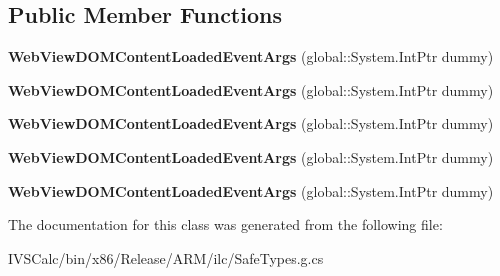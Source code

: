 \subsection*{Public Member Functions}
\begin{DoxyCompactItemize}
\item 
\mbox{\label{class_windows_1_1_u_i_1_1_xaml_1_1_controls_1_1_web_view_d_o_m_content_loaded_event_args_a5a9069485595f540edaba2c260a209bd}} 
{\bfseries Web\+View\+D\+O\+M\+Content\+Loaded\+Event\+Args} (global\+::\+System.\+Int\+Ptr dummy)
\item 
\mbox{\label{class_windows_1_1_u_i_1_1_xaml_1_1_controls_1_1_web_view_d_o_m_content_loaded_event_args_a5a9069485595f540edaba2c260a209bd}} 
{\bfseries Web\+View\+D\+O\+M\+Content\+Loaded\+Event\+Args} (global\+::\+System.\+Int\+Ptr dummy)
\item 
\mbox{\label{class_windows_1_1_u_i_1_1_xaml_1_1_controls_1_1_web_view_d_o_m_content_loaded_event_args_a5a9069485595f540edaba2c260a209bd}} 
{\bfseries Web\+View\+D\+O\+M\+Content\+Loaded\+Event\+Args} (global\+::\+System.\+Int\+Ptr dummy)
\item 
\mbox{\label{class_windows_1_1_u_i_1_1_xaml_1_1_controls_1_1_web_view_d_o_m_content_loaded_event_args_a5a9069485595f540edaba2c260a209bd}} 
{\bfseries Web\+View\+D\+O\+M\+Content\+Loaded\+Event\+Args} (global\+::\+System.\+Int\+Ptr dummy)
\item 
\mbox{\label{class_windows_1_1_u_i_1_1_xaml_1_1_controls_1_1_web_view_d_o_m_content_loaded_event_args_a5a9069485595f540edaba2c260a209bd}} 
{\bfseries Web\+View\+D\+O\+M\+Content\+Loaded\+Event\+Args} (global\+::\+System.\+Int\+Ptr dummy)
\end{DoxyCompactItemize}


The documentation for this class was generated from the following file\+:\begin{DoxyCompactItemize}
\item 
I\+V\+S\+Calc/bin/x86/\+Release/\+A\+R\+M/ilc/Safe\+Types.\+g.\+cs\end{DoxyCompactItemize}
